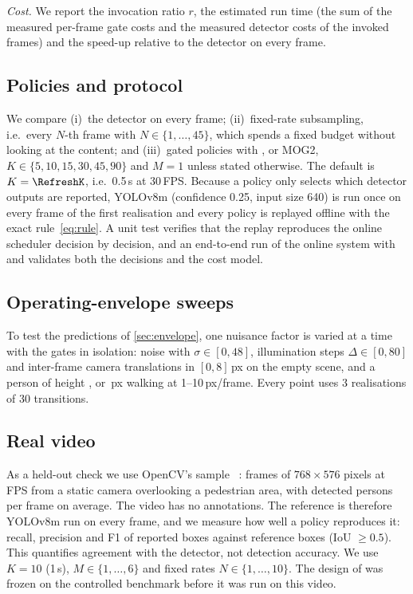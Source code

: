 \emph{Cost.} We report the invocation ratio $r$, the estimated run time (the sum of the measured per-frame gate costs and the measured detector costs of the invoked frames) and the speed-up relative to the detector on every frame.

\subsection{Policies and protocol}\label{sec:protocol}
We compare (i)~the detector on every frame; (ii)~fixed-rate subsampling, i.e.\ every $N$-th frame with $N\in\{1,\dots,45\}$, which spends a fixed budget without looking at the content; and (iii)~gated policies with \FD, \FDS{} or MOG2, $K\in\{5,10,15,30,45,90\}$ and $M=1$ unless stated otherwise. The default is $K=\RefreshK$, i.e.\ 0.5\,s at 30\,FPS. Because a policy only selects which detector outputs are reported, YOLOv8m (confidence 0.25, input size 640) is run once on every frame of the first realisation and every policy is replayed offline with the exact rule~\eqref{eq:rule}. A unit test verifies that the replay reproduces the online scheduler decision by decision, and an end-to-end run of the online system with \FD{} and \FDS{} validates both the decisions and the cost model.

\subsection{Operating-envelope sweeps}\label{sec:sweeps}
To test the predictions of \cref{sec:envelope}, one nuisance factor is varied at a time with the gates in isolation: noise with $\sigma\in[0,48]$, illumination steps $\Delta\in[0,80]$ and inter-frame camera translations in $[0,8]$\,px on the empty scene, and a person of height \HeightA, \HeightB{} or \HeightC\,px walking at 1--10\,px/frame. Every point uses 3 realisations of 30 transitions.

\subsection{Real video}\label{sec:video_setup}
As a held-out check we use OpenCV's sample ~\cite{opencv2024vtest}: \VtFrames{} frames of $768\times576$ pixels at \VtFps\,FPS from a static camera overlooking a pedestrian area, with \VtPersons{} detected persons per frame on average. The video has no annotations. The reference is therefore YOLOv8m run on every frame, and we measure how well a policy reproduces it: recall, precision and F1 of reported boxes against reference boxes (IoU $\ge0.5$). This quantifies agreement with the detector, not detection accuracy. We use $K=10$ (1\,s), $M\in\{1,\dots,6\}$ and fixed rates $N\in\{1,\dots,10\}$. The design of \FDS{} was frozen on the controlled benchmark before it was run on this video.

